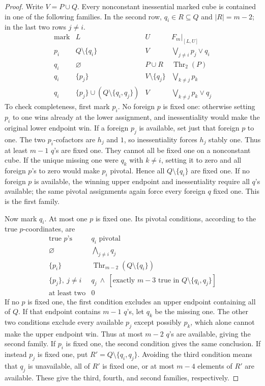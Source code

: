 \begin{proof}
Write $V=P\cup Q$. Every nonconstant inessential marked cube is contained
in one of the following families. In the second row, $q_i\in R\subseteq Q$
and $|R|=m-2$; in the last two rows $j\ne i$.
\[
\begin{array}{c|c|c|c}
 \text{mark}&L&U&F_m|_{[L,U]}\\\hline
 p_i&Q\setminus\{q_i\}&V&\displaystyle\bigvee_{j\ne i}p_j\vee q_i\\
 q_i&\varnothing&P\cup R&\operatorname{Thr}_2(P)\\
 q_i&\{p_j\}&V\setminus\{q_j\}&\displaystyle\bigvee_{k\ne j}p_k\\
 q_i&\{p_j\}\cup(Q\setminus\{q_i,q_j\})&V&\displaystyle\bigvee_{k\ne j}p_k\vee q_j
\end{array}
\]
To check completeness, first mark $p_i$. No foreign $p$ is fixed one:
otherwise setting $p_i$ to one wins already at the lower assignment,
and inessentiality would make the original lower endpoint win.
If a foreign $p_j$ is available, set just that foreign $p$ to one.
The two $p_i$-cofactors are $h_j$ and $1$, so inessentiality forces
$h_j$ stably one. Thus at least $m-1$ $q$'s are fixed one.
They cannot all be fixed one on a nonconstant cube. If the unique missing
one were $q_k$ with $k\ne i$, setting it to zero and all foreign $p$'s
to zero would make $p_i$ pivotal. Hence all $Q\setminus\{q_i\}$ are
fixed one. If no foreign $p$ is available, the winning upper endpoint
and inessentiality require all $q$'s available; the same pivotal
assignments again force every foreign $q$ fixed one. This is the first family.

Now mark $q_i$. At most one $p$ is fixed one. Its pivotal conditions,
according to the true $p$-coordinates, are
\[
\begin{array}{c|c}
 \text{true }p\text{'s}&\text{$q_i$ pivotal}\\\hline
 \varnothing&\displaystyle\bigwedge_{j\ne i}q_j\\
 \{p_i\}&\operatorname{Thr}_{m-2}(Q\setminus\{q_i\})\\
 \{p_j\},\ j\ne i&q_j\ \wedge\ [\text{exactly }m-3\text{ true in }Q\setminus\{q_i,q_j\}]\\
 \text{at least two}&0
\end{array}
\]
If no $p$ is fixed one, the first condition excludes an upper endpoint
containing all of $Q$. If that endpoint contains $m-1$ $q$'s, let $q_k$
be the missing one. The other two conditions exclude every available
$p_j$ except possibly $p_k$, which alone cannot make the upper endpoint
win. Thus at most $m-2$ $q$'s are available, giving the second family.
If $p_i$ is fixed one, the second condition gives the same conclusion.
If instead $p_j$ is fixed one, put $R'=Q\setminus\{q_i,q_j\}$.
Avoiding the third condition means that $q_j$ is unavailable, all of
$R'$ is fixed one, or at most $m-4$ elements of $R'$ are available.
These give the third, fourth, and second families, respectively.


\end{proof}
